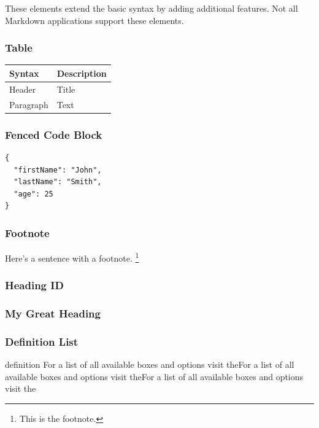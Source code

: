 \documentclass[
  a4paper,
  ,captions=tableheading
]{scrartcl}
\providecommand{\tightlist}{%
  \setlength{\itemsep}{0pt}\setlength{\parskip}{0pt}}
\begin{document}
These elements extend the basic syntax by adding additional features.
Not all Markdown applications support these elements.

\subsubsection{Table}\label{table}

\begin{longtable}[]{@{}ll@{}}
\toprule\noalign{}
Syntax & Description \\
\midrule\noalign{}
\endhead
\bottomrule\noalign{}
\endlastfoot
Header & Title \\
Paragraph & Text \\
\end{longtable}

\subsubsection{Fenced Code Block}\label{fenced-code-block}

\begin{lstlisting}
{
  "firstName": "John",
  "lastName": "Smith",
  "age": 25
}
\end{lstlisting}

\subsubsection{Footnote}\label{footnote}

Here's a sentence with a footnote. \footnote{This is the footnote.}

\subsubsection{Heading ID}\label{heading-id}

\subsubsection{My Great Heading}\label{custom-id}

\subsubsection{Definition List}\label{definition-list}

\begin{description}
\tightlist
\item[term]
definition For a list of all available boxes and options visit theFor a
list of all available boxes and options visit theFor a list of all
available boxes and options visit the
\end{description}
\end{document}
